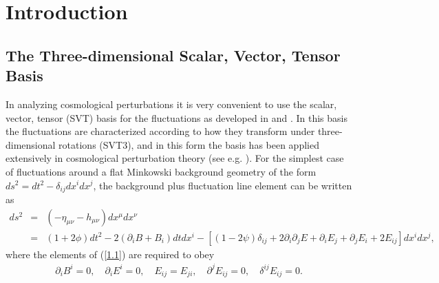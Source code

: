\documentclass[aps,onecolumn,10pt]{revtex4}
\numberwithin{equation}{section}
\numberwithin{equation}{section}
\begin{document}
\maketitle

\section{Introduction}
\label{S1}

\subsection{The Three-dimensional Scalar, Vector, Tensor Basis}
\label{S1a}

In analyzing cosmological perturbations it is very convenient to use the scalar, vector, tensor (SVT) basis for the fluctuations as developed in  \cite{Lifshitz1946}  and \cite{Bardeen1980}. In this basis the fluctuations are characterized according to how they transform under three-dimensional rotations (SVT3), and in this form the basis  has been applied extensively in cosmological perturbation theory (see e.g. \cite{Kodama1984,Bertschinger1996,Ellis2012}). For the simplest case of fluctuations around a flat Minkowski background geometry of the form $ds^2=dt^2-\delta_{ij}dx^idx^j$, the background plus fluctuation line element can be written as 
%
\begin{eqnarray}
ds^2 &=&(-\eta_{\mu\nu}-h_{\mu\nu})dx^{\mu}dx^{\nu}
\nonumber\\
&=&(1+2\phi) dt^2 -2(\partial_i B +B_i)dt dx^i - [(1-2\psi)\delta_{ij} +2\partial_i\partial_j E + \partial_i E_j + \partial_j E_i + 2E_{ij}]dx^i dx^j,
\label{1.1}
\end{eqnarray}
%
where the elements of (\ref{1.1}) are required to obey
%
\begin{eqnarray}
\partial_i B^i = 0,\quad \partial_i E^i = 0, \quad E_{ij}=E_{ji},\quad \partial^jE_{ij} = 0, \quad \delta^{ij}E_{ij} = 0.
\label{1.2}
\end{eqnarray}
%
\end{document}
